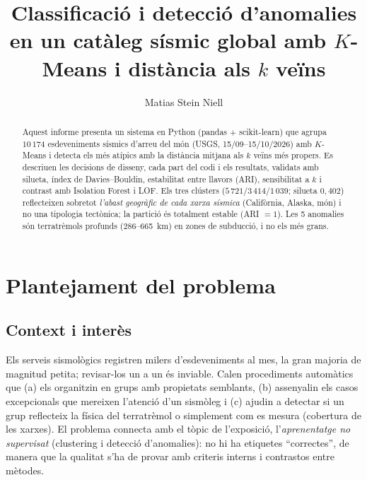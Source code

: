 \documentclass[10.5pt,a4paper]{article}
\title{\vspace{-1.3cm}\textbf{Classificació i detecció d'anomalies en un catàleg sísmic global amb $K$-Means i distància als $k$ veïns}}
\author{Matias Stein Niell}
\date{}
\begin{document}
\maketitle
\vspace{-1.2cm}
\begin{abstract}
\noindent Aquest informe presenta un sistema en Python (pandas + scikit-learn) que agrupa $10\,174$ esdeveniments sísmics d'arreu del món (USGS, 15/09--15/10/2026) amb $K$-Means i detecta els més atípics amb la distància mitjana als $k$ veïns més propers. Es descriuen les decisions de disseny, cada part del codi i els resultats, validats amb silueta, índex de Davies--Bouldin, estabilitat entre llavors (ARI), sensibilitat a $k$ i contrast amb Isolation Forest i LOF. Els tres clústers ($5\,721$/$3\,414$/$1\,039$; silueta $0{,}402$) reflecteixen sobretot \emph{l'abast geogràfic de cada xarxa sísmica} (Califòrnia, Alaska, món) i no una tipologia tectònica; la partició és totalment estable (ARI $=1$). Les 5 anomalies són terratrèmols profunds (286--665~km) en zones de subducció, i no els més grans.
\end{abstract}

\section{Plantejament del problema}
\subsection{Context i interès}
Els serveis sismològics registren milers d'esdeveniments al mes, la gran majoria de magnitud petita; revisar-los un a un és inviable. Calen procediments automàtics que (a) els organitzin en grups amb propietats semblants, (b) assenyalin els casos excepcionals que mereixen l'atenció d'un sismòleg i (c) ajudin a detectar si un grup reflecteix la física del terratrèmol o simplement com es mesura (cobertura de les xarxes). El problema connecta amb el tòpic de l'exposició, l'\emph{aprenentatge no supervisat} (clustering i detecció d'anomalies): no hi ha etiquetes ``correctes'', de manera que la qualitat s'ha de provar amb criteris interns i contrastos entre mètodes.
\end{document}
